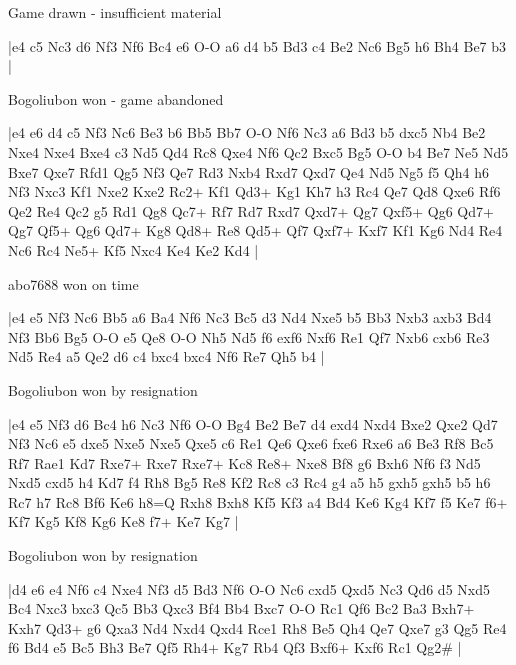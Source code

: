 \showboard

Game drawn - insufficient material

\makegametitle
|e4 c5 Nc3 d6 Nf3 Nf6 Bc4 e6 O-O a6 d4 b5 Bd3 c4 Be2 Nc6 Bg5 h6 Bh4 Be7 b3  |

\showboard

Bogoliubon won - game abandoned

\makegametitle
|e4 e6 d4 c5 Nf3 Nc6 Be3 b6 Bb5 Bb7 O-O Nf6 Nc3 a6 Bd3 b5 dxc5 Nb4 Be2 Nxe4 Nxe4 Bxe4 c3 Nd5 Qd4 Rc8 Qxe4 Nf6 Qc2 Bxc5 Bg5 O-O b4 Be7 Ne5 Nd5 Bxe7 Qxe7 Rfd1 Qg5 Nf3 Qe7 Rd3 Nxb4 Rxd7 Qxd7 Qe4 Nd5 Ng5 f5 Qh4 h6 Nf3 Nxc3 Kf1 Nxe2 Kxe2 Rc2+ Kf1 Qd3+ Kg1 Kh7 h3 Rc4 Qe7 Qd8 Qxe6 Rf6 Qe2 Re4 Qc2 g5 Rd1 Qg8 Qc7+ Rf7 Rd7 Rxd7 Qxd7+ Qg7 Qxf5+ Qg6 Qd7+ Qg7 Qf5+ Qg6 Qd7+ Kg8 Qd8+ Re8 Qd5+ Qf7 Qxf7+ Kxf7 Kf1 Kg6 Nd4 Re4 Nc6 Rc4 Ne5+ Kf5 Nxc4 Ke4 Ke2 Kd4  |

\showboard

abo7688 won on time

\makegametitle
|e4 e5 Nf3 Nc6 Bb5 a6 Ba4 Nf6 Nc3 Bc5 d3 Nd4 Nxe5 b5 Bb3 Nxb3 axb3 Bd4 Nf3 Bb6 Bg5 O-O e5 Qe8 O-O Nh5 Nd5 f6 exf6 Nxf6 Re1 Qf7 Nxb6 cxb6 Re3 Nd5 Re4 a5 Qe2 d6 c4 bxc4 bxc4 Nf6 Re7 Qh5 b4  |

\showboard

Bogoliubon won by resignation

\makegametitle
|e4 e5 Nf3 d6 Bc4 h6 Nc3 Nf6 O-O Bg4 Be2 Be7 d4 exd4 Nxd4 Bxe2 Qxe2 Qd7 Nf3 Nc6 e5 dxe5 Nxe5 Nxe5 Qxe5 c6 Re1 Qe6 Qxe6 fxe6 Rxe6 a6 Be3 Rf8 Bc5 Rf7 Rae1 Kd7 Rxe7+ Rxe7 Rxe7+ Kc8 Re8+ Nxe8 Bf8 g6 Bxh6 Nf6 f3 Nd5 Nxd5 cxd5 h4 Kd7 f4 Rh8 Bg5 Re8 Kf2 Rc8 c3 Rc4 g4 a5 h5 gxh5 gxh5 b5 h6 Rc7 h7 Rc8 Bf6 Ke6 h8=Q Rxh8 Bxh8 Kf5 Kf3 a4 Bd4 Ke6 Kg4 Kf7 f5 Ke7 f6+ Kf7 Kg5 Kf8 Kg6 Ke8 f7+ Ke7 Kg7  |

\showboard

Bogoliubon won by resignation

\makegametitle
|d4 e6 e4 Nf6 c4 Nxe4 Nf3 d5 Bd3 Nf6 O-O Nc6 cxd5 Qxd5 Nc3 Qd6 d5 Nxd5 Bc4 Nxc3 bxc3 Qc5 Bb3 Qxc3 Bf4 Bb4 Bxc7 O-O Rc1 Qf6 Bc2 Ba3 Bxh7+ Kxh7 Qd3+ g6 Qxa3 Nd4 Nxd4 Qxd4 Rce1 Rh8 Be5 Qh4 Qe7 Qxe7 g3 Qg5 Re4 f6 Bd4 e5 Bc5 Bh3 Be7 Qf5 Rh4+ Kg7 Rb4 Qf3 Bxf6+ Kxf6 Rc1 Qg2\#  |

